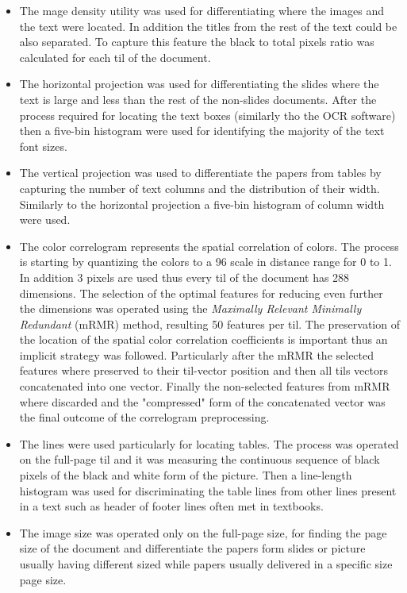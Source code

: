 \begin{itemize}
\item The mage density utility was used for differentiating where the images and the text were located. In addition the titles from the rest of the text could be also separated. To capture this feature the black to total pixels ratio was calculated for each til of the document. 
\item The horizontal projection was used for differentiating the slides where the text is large and less than the rest of the non-slides documents. After the process required for locating the text boxes (similarly tho the OCR software) then a five-bin histogram were used for identifying the majority of the text font sizes.
\item The vertical projection was used to differentiate the papers from tables by capturing the number of text columns and the distribution of their width. Similarly to the horizontal projection a five-bin histogram of column width were used.
\item The color correlogram represents the spatial correlation of colors. The process is starting by quantizing the colors to a 96 scale in distance range for 0 to 1. In addition 3 pixels are used thus every til of the document has 288 dimensions. The selection of the optimal features for reducing even further the dimensions was operated using the \textit{Maximally Relevant Minimally Redundant} (mRMR) method, resulting 50 features per til. The preservation of the location of the spatial color correlation coefficients is important thus an implicit strategy was followed. Particularly after the mRMR the selected features where preserved to their til-vector position and then all tils vectors concatenated into one vector. Finally the non-selected features from mRMR where discarded and the "compressed" form of the concatenated vector was the final outcome of the correlogram preprocessing.
\item The lines were used particularly for locating tables. The process was operated on the full-page til and it was measuring the continuous sequence of black pixels of the black and white form of the picture. Then a line-length histogram was used for discriminating the table lines from other lines present in a text such as header of footer lines often met in textbooks.
\item The image size was operated only on the full-page size, for finding the page size of the document and differentiate the papers form slides or picture usually having different sized while papers usually delivered in a specific size page size.
\end{itemize}

